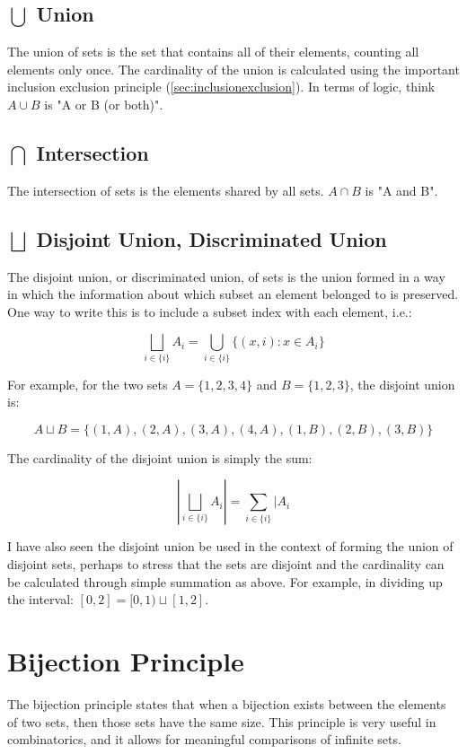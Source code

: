 \subsection{$\bigcup$ Union}
The union of sets is the set that contains all of their elements, counting all elements only once. The cardinality of the union is calculated using the important inclusion exclusion principle (\ref{sec:inclusionexclusion}). In terms of logic, think $A\cup B$ is "A or B (or both)".

\subsection{$\bigcap$ Intersection}
The intersection of sets is the elements shared by all sets. $A\cap B$ is "A and B".

\subsection{$\bigsqcup$ Disjoint Union, Discriminated Union}
The disjoint union, or discriminated union, of sets is the union formed in a way in which the information about which subset an element belonged to is preserved. One way to write this is to include a subset index with each element, i.e.:

\begin{equation}
\bigsqcup_{i\in\{i\}}A_i = \bigcup_{i\in\{i\}} \{(x,i): x\in A_i\}
\end{equation}

For example, for the two sets $A=\{1,2,3,4\}$ and $B=\{1,2,3\}$, the disjoint union is:

\begin{equation}
A\sqcup B = \{(1,A),(2,A),(3,A),(4,A),(1,B),(2,B),(3,B)\}
\end{equation}

The cardinality of the disjoint union is simply the sum:

\begin{equation}
\left|\bigsqcup_{i\in\{i\}}A_i\right| = \sum_{i\in\{i\}}|A_i
\end{equation}

I have also seen the disjoint union be used in the context of forming the union of disjoint sets, perhaps to stress that the sets are disjoint and the cardinality can be calculated through simple summation as above. For example, in dividing up the interval: $[0,2]=[0,1)\sqcup[1,2]$.


\section{Bijection Principle}
The bijection principle states that when a bijection exists between the elements of two sets, then those sets have the same size. This principle is very useful in combinatorics, and it allows for meaningful comparisons of infinite sets.


